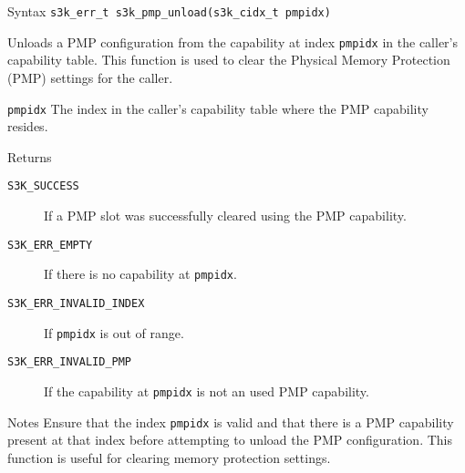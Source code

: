 \documentclass[a4paper,11pt]{article}
\newcommand{\syscall}[1]{\texttt{#1}}
\newenvironment{syscalldoc}[1]{
  \begin{tcolorbox}[breakable,title=\subsection{\syscall{#1}}]
  \begin{description}[leftmargin=!,style=nextline,noitemsep]
}{
  \end{description}
  \end{tcolorbox}
}
\begin{document}
\begin{syscalldoc}{s3k\_pmp\_unload}
  \item[Syntax] \lstinline{s3k_err_t s3k_pmp_unload(s3k_cidx_t pmpidx)}

  \item[Description] 
	  Unloads a PMP configuration from the capability at index \verb|pmpidx| in the caller's capability table. This function is used to clear the Physical Memory Protection (PMP) settings for the caller.

  \item[Parameters]
    \begin{description}
      \item[]
      \item[\texttt{pmpidx}] The index in the caller's capability table where the PMP capability resides.
    \end{description}

  \item[Returns]
    \begin{description}
      \item[]
      \item[\texttt{S3K\_SUCCESS}] If a PMP slot was successfully cleared using the PMP capability.
      \item[\texttt{S3K\_ERR\_EMPTY}] If there is no capability at \verb|pmpidx|.
      \item[\texttt{S3K\_ERR\_INVALID\_INDEX}] If \verb|pmpidx| is out of range.
      \item[\texttt{S3K\_ERR\_INVALID\_PMP}] If the capability at \verb|pmpidx| is not an used PMP capability.
    \end{description}

    \item[Notes] 
	    Ensure that the index \verb|pmpidx| is valid and that there is a PMP capability present at that index before attempting to unload the PMP configuration. This function is useful for clearing memory protection settings.
\end{syscalldoc}
\end{document}
